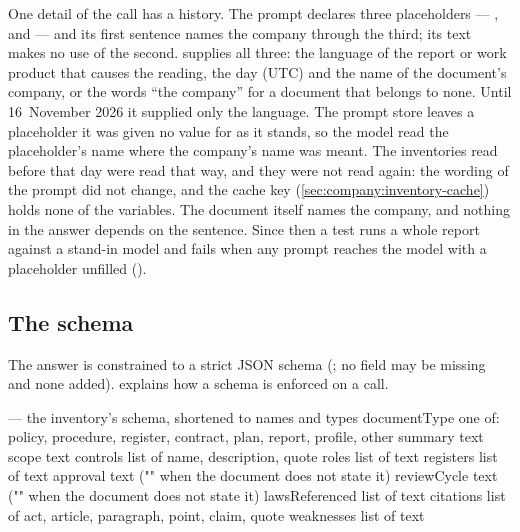 One detail of the call has a history. The prompt declares three placeholders ---
,  and  --- and its first sentence names the
company through the third; its text makes no use of the second. 
supplies all three: the language
of the report or work product that causes the reading, the day (UTC) and the name of the
document's company, or the words \enquote{the company} for a document that belongs to none.
Until 16~November 2026 it supplied only the language. The prompt store leaves a placeholder it was given no
value for as it stands, so the model read the placeholder's name where the company's name was
meant. The inventories read before that day were read that way, and they were not read
again: the
wording of the prompt did not change, and the cache key (\cref{sec:company:inventory-cache})
holds none of the variables. The document itself names the company, and nothing in the answer depends on the
sentence. Since then a test runs a whole report against a stand-in model and fails when any
prompt reaches the model with a placeholder unfilled ().

\subsection{The schema}\label{sec:company:inventory-schema}

The answer is constrained to a strict JSON schema (; no field may be missing and
none added).  explains how a schema is enforced on a call.

\begin{codefile}{ --- the inventory's schema, shortened to names and types}
documentType    one of: policy, procedure, register, contract, plan, report, profile, other
summary         text
scope           text
controls        list of { name, description, quote }
roles           list of text
registers       list of text
approval        text ("" when the document does not state it)
reviewCycle     text ("" when the document does not state it)
lawsReferenced  list of text
citations       list of { act, article, paragraph, point, claim, quote }
weaknesses      list of text
\end{codefile}

